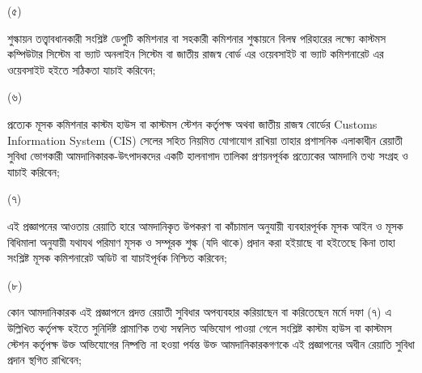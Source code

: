 \documentclass[12pt]{article}
\begin{document}
\begin{minipage}[t]{0.05\linewidth}
(৫)
\end{minipage}
\begin{minipage}[t]{0.9\linewidth}
শুল্কায়ন তত্ত্বাবধানকারী সংশ্লিষ্ট ডেপুটি কমিশনার বা
সহকারী কমিশনার শুল্কায়নে বিলম্ব পরিহারের লক্ষ্যে
কাস্টমস কম্পিউটার সিস্টেম বা ভ্যাট
অনলাইন সিস্টেম বা জাতীয় রাজস্ব বোর্ড এর
ওয়েবসাইট বা ভ্যাট কমিশনারেট এর ওয়েবসাইট
হইতে সঠিকতা যাচাই করিবেন;
\\
\end{minipage}
\begin{minipage}[t]{0.05\linewidth}
\hspace{1em}
\end{minipage}
\begin{minipage}[t]{0.05\linewidth}
(৬)
\end{minipage}
\begin{minipage}[t]{0.9\linewidth}
প্রত্যেক মূসক কমিশনার কাস্টম হাউস বা
কাস্টমস স্টেশন কর্তৃপক্ষ অথবা জাতীয় রাজস্ব বোর্ডের
Customs Information System (CIS)
সেলের সহিত নিয়মিত যোগাযোগ রাখিয়া তাহার
প্রশাসনিক এলাকাধীন রেয়াতী সুবিধা ভোগকারী
আমদানিকারক-উৎপাদকদের একটি হালনাগাদ তালিকা
প্রণয়নপূর্বক প্রত্যেকের আমদানি তথ্য সংগ্রহ ও যাচাই
করিবেন;
\\
\end{minipage}
\begin{minipage}[t]{0.05\linewidth}
\hspace{1em}
\end{minipage}
\begin{minipage}[t]{0.05\linewidth}
(৭)
\end{minipage}
\begin{minipage}[t]{0.9\linewidth}
এই প্রজ্ঞাপনের আওতায় রেয়াতি হারে আমদানিকৃত
উপকরণ বা কাঁচামাল অনুযায়ী ব্যবহারপূর্বক মূসক
আইন ও মূসক বিধিমালা অনুযায়ী
যথাযথ পরিমাণ মূসক ও সম্পূরক শুল্ক (যদি থাকে) প্রদান
করা হইয়াছে বা হইতেছে কিনা তাহা সংশ্লিষ্ট মূসক
কমিশনারেট অডিট বা যাচাইপূর্বক নিশ্চিত করিবেন;
\\
\end{minipage}
\begin{minipage}[t]{0.05\linewidth}
\hspace{1em}
\end{minipage}
\begin{minipage}[t]{0.05\linewidth}
(৮)
\end{minipage}
\begin{minipage}[t]{0.9\linewidth}
কোন আমদানিকারক এই প্রজ্ঞাপনে প্রদত্ত রেয়াতী
সুবিধার অপব্যবহার করিয়াছেন বা করিতেছেন
মর্মে দফা (৭) এ উল্লিখিত কর্তৃপক্ষ হইতে সুনির্দিষ্ট
প্রামাণিক তথ্য সম্বলিত অভিযোগ পাওয়া গেলে সংশ্লিষ্ট
কাস্টম হাউস বা কাস্টমস স্টেশন কর্তৃপক্ষ উক্ত অভিযোগের
নিষ্পত্তি না হওয়া পর্যন্ত উক্ত আমদানিকারকগণকে
এই প্রজ্ঞাপনের অধীন রেয়াতি সুবিধা প্রদান স্থগিত রাখিবেন;
\\
\end{minipage}
\end{document}
